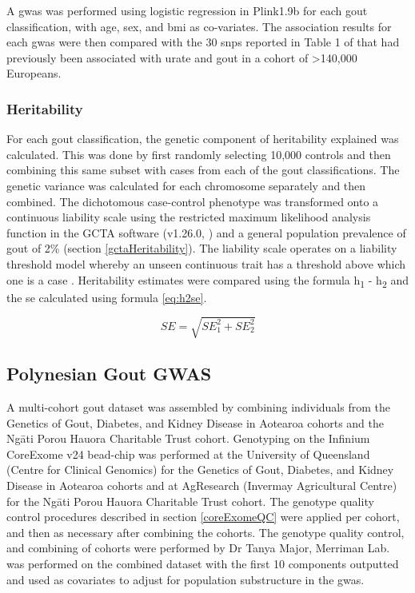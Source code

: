 \documentclass[twoside,openright]{report}
\newcommand{\tex}[1]{#1}
\begin{document}
A \gls{gwas} was performed using logistic regression in Plink1.9b
\citep{Chang2015, plink2} for each gout classification, with age, sex,
and \gls{bmi} as co-variates. The association results for each
\gls{gwas} were then compared with the 30 \glspl{snp} reported in Table
1 of \citet{Kottgen2013} that had previously been associated with urate
and gout in a cohort of \textgreater{}140,000 Europeans.

\subsubsection{Heritability}\label{heritability}

For each gout classification, the genetic component of heritability
explained was calculated. This was done by first randomly selecting
10,000 controls and then combining this same subset with cases from each
of the gout classifications. The genetic variance was calculated for
each chromosome separately and then combined. The dichotomous
case-control phenotype was transformed onto a continuous liability scale
using the restricted maximum likelihood analysis function in the GCTA
software (v1.26.0, \citet{Yang2011part}) and a general population
prevalence of gout of 2\% (section \ref{gctaHeritability}). The
liability scale operates on a liability threshold model whereby an
unseen continuous trait has a threshold above which one is a case
\citep{Lee2011, Zuk2012}. Heritability estimates were compared using the
formula h\textsubscript{1} - h\textsubscript{2} and the \gls{se}
calculated using formula \eqref{eq:h2se}.

\begin{equation} 
 SE = \sqrt{SE_1^2 + SE_2^2}
 \label{eq:h2se}
\end{equation}

\subsection{Polynesian Gout GWAS}\label{polynesian-gout-gwas}

A multi-cohort gout dataset was assembled by combining individuals from
the Genetics of Gout, Diabetes, and Kidney Disease in Aotearoa cohorts
and the Ng\tex{\={a}}ti Porou Hauora Charitable Trust cohort. Genotyping
on the Infinium CoreExome v24 bead-chip was performed at the University
of Queensland (Centre for Clinical Genomics) for the Genetics of Gout,
Diabetes, and Kidney Disease in Aotearoa cohorts and at AgResearch
(Invermay Agricultural Centre) for the Ng\tex{\={a}}ti Porou Hauora
Charitable Trust cohort. The genotype quality control procedures
described in section \ref{coreExomeQC} were applied per cohort, and then
as necessary after combining the cohorts. The genotype quality control,
and combining of cohorts were performed by Dr Tanya Major, Merriman Lab.
 was performed on the combined dataset with the first 10
components outputted and used as covariates to adjust for population
substructure in the \gls{gwas}.
\end{document}
